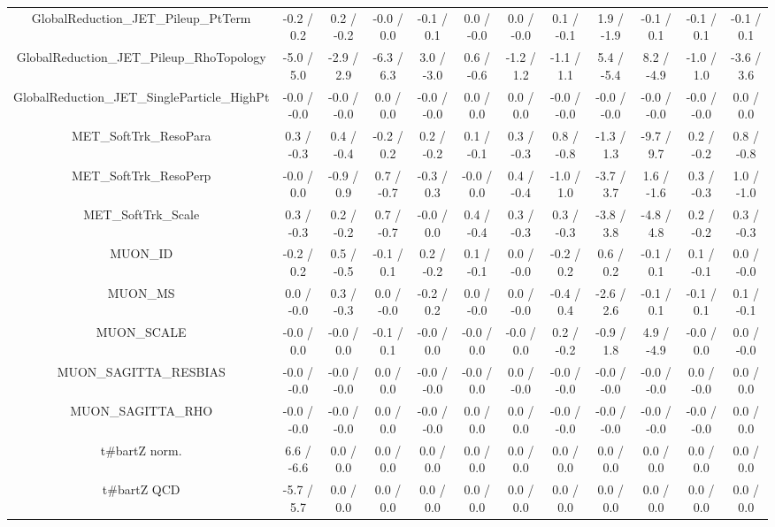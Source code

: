 \begin{table}[htbp]
\begin{center}
\begin{tabular}{|c|c|c|c|c|c|c|c|c|c|c|c|}
  GlobalReduction_JET_Pileup_PtTerm & -0.2 / 0.2 & 0.2 / -0.2 & -0.0 / 0.0 & -0.1 / 0.1 & 0.0 / -0.0 & 0.0 / -0.0 & 0.1 / -0.1 & 1.9 / -1.9 & -0.1 / 0.1 & -0.1 / 0.1 & -0.1 / 0.1 \\ 
  GlobalReduction_JET_Pileup_RhoTopology & -5.0 / 5.0 & -2.9 / 2.9 & -6.3 / 6.3 & 3.0 / -3.0 & 0.6 / -0.6 & -1.2 / 1.2 & -1.1 / 1.1 & 5.4 / -5.4 & 8.2 / -4.9 & -1.0 / 1.0 & -3.6 / 3.6 \\ 
  GlobalReduction_JET_SingleParticle_HighPt & -0.0 / -0.0 & -0.0 / -0.0 & 0.0 / 0.0 & -0.0 / -0.0 & 0.0 / 0.0 & 0.0 / 0.0 & -0.0 / -0.0 & -0.0 / -0.0 & -0.0 / -0.0 & -0.0 / -0.0 & 0.0 / 0.0 \\ 
  MET_SoftTrk_ResoPara & 0.3 / -0.3 & 0.4 / -0.4 & -0.2 / 0.2 & 0.2 / -0.2 & 0.1 / -0.1 & 0.3 / -0.3 & 0.8 / -0.8 & -1.3 / 1.3 & -9.7 / 9.7 & 0.2 / -0.2 & 0.8 / -0.8 \\ 
  MET_SoftTrk_ResoPerp & -0.0 / 0.0 & -0.9 / 0.9 & 0.7 / -0.7 & -0.3 / 0.3 & -0.0 / 0.0 & 0.4 / -0.4 & -1.0 / 1.0 & -3.7 / 3.7 & 1.6 / -1.6 & 0.3 / -0.3 & 1.0 / -1.0 \\ 
  MET_SoftTrk_Scale & 0.3 / -0.3 & 0.2 / -0.2 & 0.7 / -0.7 & -0.0 / 0.0 & 0.4 / -0.4 & 0.3 / -0.3 & 0.3 / -0.3 & -3.8 / 3.8 & -4.8 / 4.8 & 0.2 / -0.2 & 0.3 / -0.3 \\ 
  MUON_ID & -0.2 / 0.2 & 0.5 / -0.5 & -0.1 / 0.1 & 0.2 / -0.2 & 0.1 / -0.1 & 0.0 / -0.0 & -0.2 / 0.2 & 0.6 / 0.2 & -0.1 / 0.1 & 0.1 / -0.1 & 0.0 / -0.0 \\ 
  MUON_MS & 0.0 / -0.0 & 0.3 / -0.3 & 0.0 / -0.0 & -0.2 / 0.2 & 0.0 / -0.0 & 0.0 / -0.0 & -0.4 / 0.4 & -2.6 / 2.6 & -0.1 / 0.1 & -0.1 / 0.1 & 0.1 / -0.1 \\ 
  MUON_SCALE & -0.0 / 0.0 & -0.0 / 0.0 & -0.1 / 0.1 & -0.0 / 0.0 & -0.0 / 0.0 & -0.0 / 0.0 & 0.2 / -0.2 & -0.9 / 1.8 & 4.9 / -4.9 & -0.0 / 0.0 & 0.0 / -0.0 \\ 
  MUON_SAGITTA_RESBIAS & -0.0 / -0.0 & -0.0 / -0.0 & 0.0 / 0.0 & -0.0 / -0.0 & -0.0 / 0.0 & 0.0 / -0.0 & -0.0 / -0.0 & -0.0 / -0.0 & -0.0 / -0.0 & 0.0 / -0.0 & 0.0 / 0.0 \\ 
  MUON_SAGITTA_RHO & -0.0 / -0.0 & -0.0 / -0.0 & 0.0 / 0.0 & -0.0 / -0.0 & 0.0 / 0.0 & 0.0 / 0.0 & -0.0 / -0.0 & -0.0 / -0.0 & -0.0 / -0.0 & -0.0 / -0.0 & 0.0 / 0.0 \\ 
  t#bar{t}Z norm. & 6.6 / -6.6 & 0.0 / 0.0 & 0.0 / 0.0 & 0.0 / 0.0 & 0.0 / 0.0 & 0.0 / 0.0 & 0.0 / 0.0 & 0.0 / 0.0 & 0.0 / 0.0 & 0.0 / 0.0 & 0.0 / 0.0 \\ 
  t#bar{t}Z QCD & -5.7 / 5.7 & 0.0 / 0.0 & 0.0 / 0.0 & 0.0 / 0.0 & 0.0 / 0.0 & 0.0 / 0.0 & 0.0 / 0.0 & 0.0 / 0.0 & 0.0 / 0.0 & 0.0 / 0.0 & 0.0 / 0.0 \\ 

\end{tabular}
\end{center}
\end{table}
